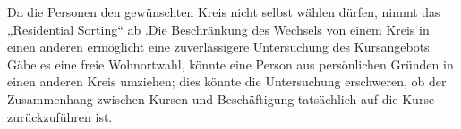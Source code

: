 Da die Personen den gewünschten Kreis nicht selbst wählen dürfen, nimmt das „Residential Sorting“ ab \parencite{Kanas:2023}.Die Beschränkung des Wechsels von einem Kreis in einen anderen ermöglicht eine zuverlässigere Untersuchung des Kursangebots. Gäbe es eine freie Wohnortwahl, könnte eine Person aus persönlichen Gründen in einen anderen Kreis umziehen; dies könnte die Untersuchung erschweren, ob der Zusammenhang zwischen Kursen und Beschäftigung tatsächlich auf die Kurse zurückzuführen ist.







